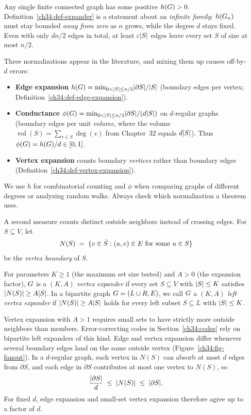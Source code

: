 Any single finite connected graph has some positive $h(G) > 0$. Definition~\ref{ch34:def-expander} is a statement about an \emph{infinite family}: $h(G_n)$ must stay bounded \emph{away from zero} as $n$ grows, while the degree $d$ stays fixed. Even with only $dn/2$ edges in total, at least $\varepsilon\lvert S\rvert$ edges leave every set $S$ of size at most $n/2$.

\begin{focusbox}
Three normalizations appear in the literature, and mixing them up causes off-by-$d$ errors:
\begin{itemize}
  \item \textbf{Edge expansion} $h(G)=\min_{0<\lvert S\rvert\le n/2} \lvert\partial S\rvert/\lvert S\rvert$ (boundary edges per vertex; Definition~\ref{ch34:def-edge-expansion}).
  \item \textbf{Conductance} $\phi(G)=\min_{0<\lvert S\rvert\le n/2} \lvert\partial S\rvert/(d\lvert S\rvert)$ on $d$-regular graphs (boundary edges per unit \emph{volume}, where the volume $\operatorname{vol}(S)=\sum_{v\in S}\deg(v)$ from Chapter~32 equals $d\lvert S\rvert$). Thus $\phi(G) = h(G)/d \in [0,1]$.
  \item \textbf{Vertex expansion} counts boundary \emph{vertices} rather than boundary edges (Definition~\ref{ch34:def-vertex-expansion}).
\end{itemize}
We use $h$ for combinatorial counting and $\phi$ when comparing graphs of different degrees or analyzing random walks. Always check which normalization a theorem uses.
\end{focusbox}

A second measure counts distinct outside neighbors instead of crossing edges. For $S\subseteq V$, let
\[
  N(S) \;=\; \{v\in \bar S : (u,v)\in E \text{ for some } u\in S\}
\]
be the \emph{vertex boundary} of $S$.

\begin{definition}
\label{ch34:def-vertex-expansion}
For parameters $K\ge 1$ (the maximum set size tested) and $A>0$ (the expansion factor), $G$ is a \emph{$(K,A)$ vertex expander} if every set $S\subseteq V$ with $\lvert S\rvert\le K$ satisfies $\lvert N(S)\rvert\ge A\lvert S\rvert$. In a bipartite graph $G=(L\cup R,E)$, we call $G$ a \emph{$(K,A)$ left vertex expander} if $\lvert N(S)\rvert\ge A\lvert S\rvert$ holds for every left subset $S\subseteq L$ with $\lvert S\rvert\le K$.
\end{definition}

Vertex expansion with $A>1$ requires small sets to have strictly more outside neighbors than members. Error-correcting codes in Section~\ref{ch34:codes} rely on bipartite left expanders of this kind. Edge and vertex expansion differ whenever several boundary edges land on the same outside vertex (Figure~\ref{ch34:fig-fanout}). In a $d$-regular graph, each vertex in $N(S)$ can absorb at most $d$ edges from $\partial S$, and each edge in $\partial S$ contributes at most one vertex to $N(S)$, so
\[
  \frac{\lvert\partial S\rvert}{d} \;\le\; \lvert N(S)\rvert \;\le\; \lvert\partial S\rvert.
\]
For fixed $d$, edge expansion and small-set vertex expansion therefore agree up to a factor of $d$.

